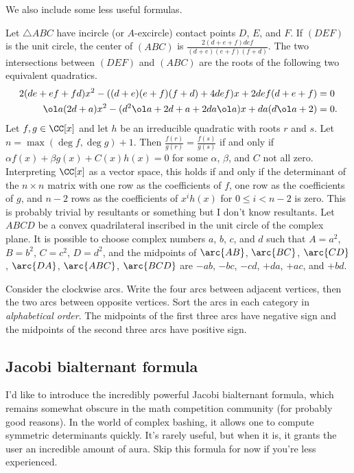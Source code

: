 \documentclass[11pt]{scrartcl}
\begin{document}
We also include some less useful formulas.
\begin{itemize}
    \ii Let $\triangle ABC$ have incircle (or $A$-excircle) contact points $D$, $E$, and $F$. If $(DEF)$ is the unit circle, the center of $(ABC)$ is $\frac{2(d + e + f)def}{(d + e)(e + f)(f + d)}$. The two intersections between $(DEF)$ and $(ABC)$ are the roots of the following two equivalent quadratics.
    \begin{align*}
        2(de + ef + fd)x^2 - ((d + e)(e + f)(f + d) + 4def)x + 2def(d + e + f) &= 0 \\
        \ol a(2d + a)x^2 - (d^2\ol a + 2d + a + 2da\ol a)x + da(d\ol a + 2) &= 0.
    \end{align*}
    \ii Let $f,g \in \CC[x]$ and let $h$ be an irreducible quadratic with roots $r$ and $s$. Let $n = \max(\deg f,\deg g) + 1$. Then $\frac{f(r)}{g(r)} = \frac{f(s)}{g(s)}$ if and only if $\alpha f(x) + \beta g(x) + C(x)h(x) = 0$ for some $\alpha$, $\beta$, and $C$ not all zero. Interpreting $\CC[x]$ as a vector space, this holds if and only if the determinant of the $n \times n$ matrix with one row as the coefficients of $f$, one row as the coefficients of $g$, and $n - 2$ rows as the coefficients of $x^ih(x)$ for $0 \le i < n - 2$ is zero. This is probably trivial by resultants or something but I don't know resultants.
    \ii Let $ABCD$ be a convex quadrilateral inscribed in the unit circle of the complex plane. It is possible to choose complex numbers $a$, $b$, $c$, and $d$ such that $A = a^2$, $B = b^2$, $C = c^2$, $D = d^2$, and the midpoints of $\arc{AB}$, $\arc{BC}$, $\arc{CD}$, $\arc{DA}$, $\arc{ABC}$, $\arc{BCD}$ are $-ab$, $-bc$, $-cd$, $+da$, $+ac$, and $+bd$.
    \begin{remark*}
        Consider the clockwise arcs. Write the four arcs between adjacent vertices, then the two arcs between opposite vertices. Sort the arcs in each category in \emph{alphabetical order}. The midpoints of the first three arcs have negative sign and the midpoints of the second three arcs have positive sign.
    \end{remark*}
\end{itemize}

\subsection{Jacobi bialternant formula}
\label{ssec:jacobi-bialternant}

I'd like to introduce the incredibly powerful Jacobi bialternant formula, which remains somewhat obscure in the math competition community (for probably good reasons). In the world of complex bashing, it allows one to compute symmetric determinants quickly. It's rarely useful, but when it is, it grants the user an incredible amount of aura. \alert{Skip this formula for now if you're less experienced.}
\end{document}
